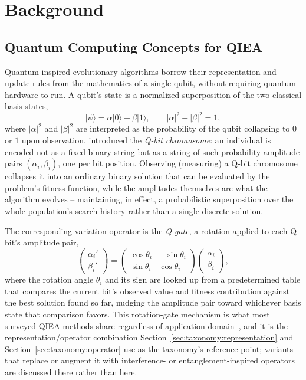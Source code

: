 \section{Background}
\label{sec:background}

\subsection{Quantum Computing Concepts for QIEA}
\label{sec:background:quantum}

Quantum-inspired evolutionary algorithms borrow their representation and
update rules from the mathematics of a single qubit, without requiring
quantum hardware to run. A qubit's state is a normalized superposition of
the two classical basis states,
\begin{equation}
  \label{eq:qubit}
  \lvert\psi\rangle = \alpha\lvert 0\rangle + \beta\lvert 1\rangle,
  \qquad \lvert\alpha\rvert^2 + \lvert\beta\rvert^2 = 1,
\end{equation}
where $\lvert\alpha\rvert^2$ and $\lvert\beta\rvert^2$ are interpreted as
the probability of the qubit collapsing to $0$ or $1$ upon observation.
\citet{han2002qea} introduced the \emph{Q-bit chromosome}: an individual
is encoded not as a fixed binary string but as a string of such
probability-amplitude pairs $(\alpha_i,\beta_i)$, one per bit position.
Observing (measuring) a Q-bit chromosome collapses it into an ordinary
binary solution that can be evaluated by the problem's fitness function,
while the amplitudes themselves are what the algorithm evolves --
maintaining, in effect, a probabilistic superposition over the whole
population's search history rather than a single discrete solution.

The corresponding variation operator is the \emph{Q-gate}, a rotation
applied to each Q-bit's amplitude pair,
\begin{equation}
  \label{eq:qgate}
  \begin{pmatrix}\alpha_i'\\ \beta_i'\end{pmatrix}
  =
  \begin{pmatrix}\cos\theta_i & -\sin\theta_i\\ \sin\theta_i & \cos\theta_i\end{pmatrix}
  \begin{pmatrix}\alpha_i\\ \beta_i\end{pmatrix},
\end{equation}
where the rotation angle $\theta_i$ and its sign are looked up from a
predetermined table that compares the current bit's observed value and
fitness contribution against the best solution found so far, nudging the
amplitude pair toward whichever basis state that comparison favors. This
rotation-gate mechanism is what most surveyed QIEA methods share
regardless of application domain~\citep{vivek2025fss}, and it is the
representation/operator combination
Section~\ref{sec:taxonomy:representation} and
Section~\ref{sec:taxonomy:operator} use as the taxonomy's reference
point; variants that replace or augment it with interference- or
entanglement-inspired operators are discussed there rather than here.

